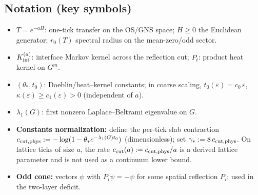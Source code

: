 \documentclass[11pt]{amsart}
\theoremstyle{plain}
\theoremstyle{definition}
\theoremstyle{remark}
\begin{document}
\subsection*{Notation (key symbols)}
\begin{itemize}[leftmargin=2em, itemsep=6pt]
  \item $T=e^{-aH}$: one-tick transfer on the OS/GNS space; $H\ge 0$ the Euclidean generator; $r_0(T)$ spectral radius on the mean-zero/odd sector.
  
  \item $K_{\rm int}^{(a)}$: interface Markov kernel across the reflection cut; $P_t$: product heat kernel on $G^m$.
  
  \item $(\theta_*,t_0)$: Doeblin/heat--kernel constants; in coarse scaling, $t_0(\varepsilon)=c_0\,\varepsilon$, $\kappa(\varepsilon)\ge c_1(\varepsilon)>0$ (independent of $a$).
  
  \item $\lambda_1(G)$: first nonzero Laplace--Beltrami eigenvalue on $G$.
  
  \item \textbf{Constants normalization:} define the per-tick slab contraction $c_{\rm cut,phys}:= -\log(1-\theta_* e^{-\lambda_1(G) t_0})$ (dimensionless); set $\gamma_*:=8\,c_{\rm cut,phys}$. On lattice ticks of size $a$, the rate $c_{\rm cut}(a):=c_{\rm cut,phys}/a$ is a derived lattice parameter and is not used as a continuum lower bound.
  
  \item \textbf{Odd cone:} vectors $\psi$ with $P_i\psi=-\psi$ for some spatial reflection $P_i$; used in the two-layer deficit.
\end{itemize}
\end{document}
